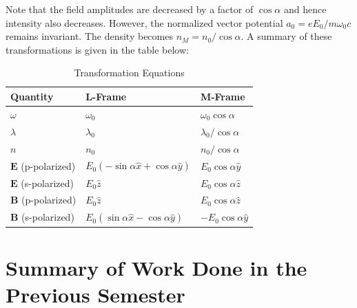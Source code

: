 \documentclass[12pt]{article}
\begin{document}
Note that the field amplitudes are decreased by a factor of $\cos\alpha$ and hence intensity also decreases. However, the normalized vector potential $a_0 = eE_0/m\omega_0c$ remains invariant. The density becomes $n_M = n_0/\cos\alpha$. A summary of these transformations is given in the table below:
\begin{table}[!ht]
    \centering
    \caption{Transformation Equations}
    \label{tab:transformation}
    \vspace{0.3cm}
    \begin{tabular}{|l|l|l|}
        \hline
        \textbf{Quantity}          & \textbf{L-Frame}                                 & \textbf{M-Frame}          \\ \hline
        $\omega$                   & $\omega_0$                                       & $\omega_0 \cos\alpha$     \\ \hline
        $\lambda$                  & $\lambda_0$                                      & $\lambda_0/\cos\alpha$    \\ \hline
        $n$                        & $n_0$                                            & $n_0/\cos\alpha$          \\ \hline
        $\mathbf{E}$ (p-polarized) & $E_0 (-\sin\alpha \hat{x} + \cos\alpha \hat{y})$ & $E_0 \cos\alpha \hat{y}$  \\ \hline
        $\mathbf{E}$ (s-polarized) & $E_0 \hat{z}$                                    & $E_0 \cos\alpha \hat{z}$  \\ \hline
        $\mathbf{B}$ (p-polarized) & $E_0 \hat{z}$                                    & $E_0 \cos\alpha \hat{z}$  \\ \hline
        $\mathbf{B}$ (s-polarized) & $E_0 (\sin\alpha \hat{x} - \cos\alpha \hat{y})$  & $-E_0 \cos\alpha \hat{y}$ \\ \hline
    \end{tabular}
\end{table}

\section{Summary of Work Done in the Previous Semester}

\end{document}
